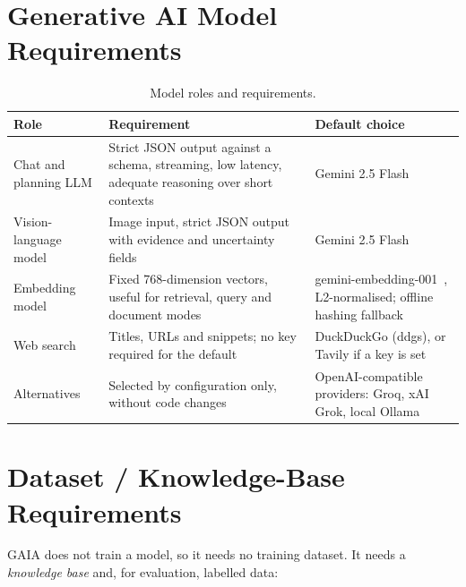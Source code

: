\section{Generative AI Model Requirements}

\begin{table}[H]
\centering
\caption{Model roles and requirements.}
\label{tab:models}
\small
\begin{tabular}{|P{2.5cm}|P{4.4cm}|P{5.9cm}|}
\hline
\textbf{Role} & \textbf{Requirement} & \textbf{Default choice}\\\hline
Chat and planning LLM & Strict JSON output against a schema, streaming, low latency, adequate reasoning over short contexts & Gemini 2.5 Flash~\cite{gemini25}\\\hline
Vision-language model & Image input, strict JSON output with evidence and uncertainty fields & Gemini 2.5 Flash~\cite{gemini25}\\\hline
Embedding model & Fixed 768-dimension vectors, useful for retrieval, query and document modes & gemini-embedding-001~\cite{lee2025geminiembedding}, L2-normalised; offline hashing fallback\\\hline
Web search & Titles, URLs and snippets; no key required for the default & DuckDuckGo (ddgs), or Tavily if a key is set\\\hline
Alternatives & Selected by configuration only, without code changes & OpenAI-compatible providers: Groq, xAI Grok, local Ollama\\\hline
\end{tabular}
\end{table}

\section{Dataset / Knowledge-Base Requirements}

GAIA does not train a model, so it needs no training dataset. It needs a \emph{knowledge base} and, for evaluation, labelled data:

